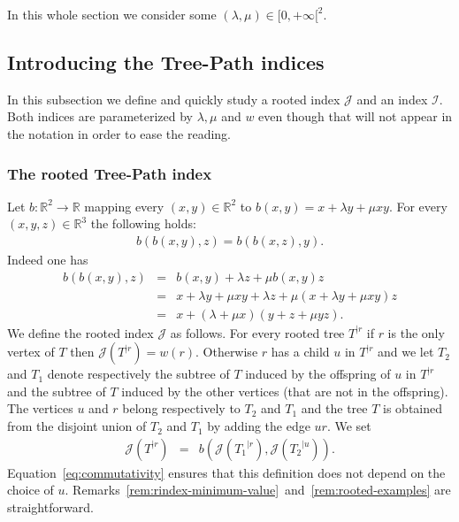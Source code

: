 \documentclass[11 pt]{modarticle}
\newcommand{\cR}{\mathbb{R}}
\newcommand{\wmap}{w}
\newcommand{\rtree}[2]{{#1}^{\lvert #2}}
\newcommand{\bilinear}{b}
\newcommand{\indexsymbol}{\mathcal{I}}
\newcommand{\rindexsymbol}{\mathcal{J}}
\newcommand{\rindex}[2]{\rindexsymbol(\rtree{#2}{#1})}
\begin{document}
In this whole section we consider some $(\lambda, \mu) \in [0,+\infty[^2$.


\subsection{Introducing the Tree-Path indices}

In this subsection we define and quickly study a rooted index $\rindexsymbol$ and an index $\indexsymbol$. Both indices are parameterized by $\lambda, \mu$ and $\wmap$ even though that will not appear in the notation in order to ease the reading.

\subsubsection{The rooted Tree-Path index}

Let $\bilinear : \cR^2 \to \cR$ mapping every $(x,y) \in \cR^2$ to $\bilinear(x,y) = x + \lambda y + \mu x y$. For every $(x,y,z) \in \cR^3$ the following holds:
\begin{eqnarray}
	\bilinear(\bilinear(x,y),z) = \bilinear(\bilinear(x,z),y). \label{eq:commutativity}
\end{eqnarray}
Indeed one has
\begin{eqnarray*}
	\bilinear(\bilinear(x,y),z) & = & \bilinear(x,y) + \lambda z + \mu \bilinear(x,y) z \\
	& = & x + \lambda y + \mu x y + \lambda z + \mu (x + \lambda y + \mu x y) z \\
	& = & x + (\lambda + \mu x) (y+z + \mu y z).
\end{eqnarray*}
We define the rooted index $\rindexsymbol$ as follows. For every rooted tree $\rtree{T}{r}$ if $r$ is the only vertex of $T$ then $\rindex{r}{T} = \wmap(r)$. Otherwise $r$ has a child $u$ in $\rtree{T}{r}$ and we let $T_2$ and $T_1$ denote respectively the subtree of $T$ induced by the offspring of $u$ in $\rtree{T}{r}$ and the subtree of $T$ induced by the other vertices (that are not in the offspring). The vertices $u$ and $r$ belong respectively to $T_2$ and $T_1$ and the tree $T$ is obtained from the disjoint union of $T_2$ and $T_1$ by adding the edge $ur$. We set
\begin{eqnarray}
	\rindex{r}{T} & = & \bilinear(\rindex{r}{T_1}, \rindex{u}{T_2}). \label{eq:rindex-tree-decomp}
\end{eqnarray}
Equation~\eqref{eq:commutativity} ensures that this definition does not depend on the choice of $u$. Remarks~\ref{rem:rindex-minimum-value}~and~\ref{rem:rooted-examples} are straightforward.
\end{document}
